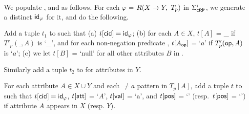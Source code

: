 We populate ,  and \Enc{\ne}  as follows. For each
\pCFD $\varphi$ = $R(X\rightarrow Y,\ T_p)$ in $\Sigma_{{\mathsf{cfd^p}}}^i$,
we generate a distinct  ${\mathsf{id}}_\varphi$ for it, and do the following.
\bi
\item Add a tuple $t_1$ to  such that
(a) $t[\protect\mathsf{cid}] = {\mathsf{id}}_\varphi$; (b) for each $A\in X$,
$t[A]$ = \_ if $T'_p(\_,A)$ is `\_', and for each non-negation
predicate \op, $t[A_{{\mathsf{op}}}]$ = `$a$' if $T'_p({\mathsf{op}},A)$
is `\op $a$'; (c) we let $t[B]$ = `null' for all other attributes $B$
in .
\vspace{0.8ex}

\item Similarly add a tuple $t_2$ to  for attributes in $Y$.
\vspace{0.5ex}

\item For each attribute $A\in X\cup Y$ and each $\ne a$ pattern in
$T_p[A]$, add a tuple $t$ to \Enc{\ne} such that $t[\protect\mathsf{cid}] =
{\mathsf{id}}_\varphi$, $t[\protect\mathsf{att}]$ = `$A$', $t[\protect\mathsf{val}]$ = `a', and
$t[\protect\mathsf{pos}]$ = `\LHS' (resp.~$t[\protect\mathsf{pos}]$ = `\RHS') if attribute
$A$ appears in $X$ (resp. $Y$). \ei\vspace{-1ex}


